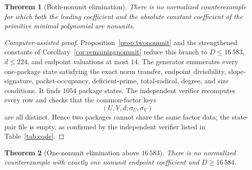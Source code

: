 \documentclass[11pt]{article}
\numberwithin{equation}{section}
\newtheorem{theorem}{Theorem}[section]
\theoremstyle{definition}
\begin{document}
\begin{theorem}[Both-nonunit elimination]
\label{thm:twononunitelimination}
There is no normalized counterexample for which both the leading coefficient
and the absolute constant coefficient of the primitive minimal polynomial are
nonunits.
\end{theorem}

\begin{proof}[Computer-assisted proof]
Proposition~\ref{prop:twononunit} and the strengthened constants of
Corollary~\ref{cor:remainingnonunit} reduce this branch to
\(D\leq16\,583\), \(d\leq224\), and endpoint valuations at most \(14\).
The generator enumerates every one-package state satisfying the exact norm
transfer, endpoint divisibility, slope-signature, packet-occupancy,
deficient-prime, total-radical, degree, and size conditions.  It finds
\(1054\) package states.  The independent verifier recomputes every row and
checks that the common-factor keys
\[
 (U,V,d;\sigma_U,\sigma_V)
\]
are all distinct.  Hence two packages cannot share the same factor data; the
state-pair file is empty, as confirmed by the independent verifier listed in
Table~\ref{tab:code}.
\end{proof}

\begin{theorem}[One-nonunit elimination above \(16\,583\)]
\label{thm:onenonunitlargeelimination}
There is no normalized counterexample with exactly one nonunit endpoint
coefficient and \(D\geq16\,584\).
\end{theorem}
\end{document}

